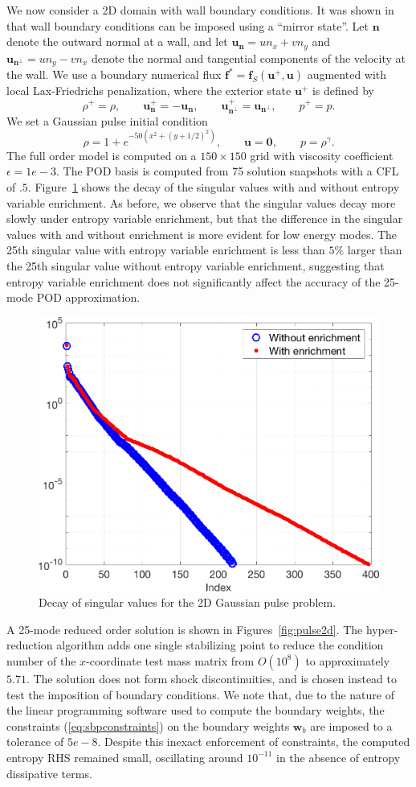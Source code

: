 \documentclass[preprint,10pt]{elsarticle}
\theoremstyle{definition}
\theoremstyle{lemma}
\theoremstyle{theorem}
\theoremstyle{assumption}
\newcommand{\LRp}[1]{\left( #1 \right)}
\begin{document}
We now consider a 2D domain with wall boundary conditions.  It was shown in \cite{svard2014entropy, chen2017entropy} that wall boundary conditions can be imposed using a ``mirror state''.  Let $\bm{n}$ denote the outward normal at a wall, and let $\bm{u}_{\bm{n}} = un_x + vn_y$ and $\bm{u}_{\bm{n}^\perp} = un_y - vn_x$ denote the normal and tangential components of the velocity at the wall.  We use a boundary numerical flux $\bm{f}^* = \bm{f}_S\LRp{\bm{u}^+,\bm{u}}$ augmented with local Lax-Friedrichs penalization, where the exterior state $\bm{u}^+$ is defined by
\[
\rho^+ = \rho, \qquad \bm{u}_{\bm{n}}^+ = -\bm{u}_{\bm{n}}, \qquad \bm{u}_{\bm{n}^\perp}^+ = \bm{u}_{\bm{n}^\perp}, \qquad p^+ = p.  
\]
We set a Gaussian pulse initial condition 
\[
\rho = 1 + e^{-50\LRp{x^2+(y+1/2)^2}}, \qquad \bm{u} = \bm{0}, \qquad p = \rho^{\gamma}.  
\]
The full order model is computed on a $150\times 150$ grid with viscosity coefficient $\epsilon = 1e-3$.  The POD basis is computed from 75 solution snapshots with a CFL of $.5$.  Figure~\ref{fig:pulse2dsvd} shows the decay of the singular values with and without entropy variable enrichment.  As before, we observe that the singular values decay more slowly under entropy variable enrichment, but that the difference in the singular values with and without enrichment is more evident for low energy modes.  The 25th singular value with entropy variable enrichment is less than $5\%$ larger than the 25th singular value without entropy variable enrichment, suggesting that entropy variable enrichment does not significantly affect the accuracy of the 25-mode POD approximation.  

\begin{figure}
\centering
\includegraphics[width=.4\textwidth]{figs/pulse2dsvd.png}
\caption{Decay of singular values for the 2D Gaussian pulse problem.}
\label{fig:pulse2dsvd}
\end{figure}

A 25-mode reduced order solution is shown in Figures~\ref{fig:pulse2d}.  The hyper-reduction algorithm adds one single stabilizing point to reduce the condition number of the $x$-coordinate test mass matrix from $O(10^{8})$ to approximately $5.71$.  The solution does not form shock discontinuities, and is chosen instead to test the imposition of boundary conditions.  We note that, due to the nature of the linear programming software used to compute the boundary weights, the constraints (\ref{eq:sbpconstraints}) on the boundary weights $\bm{w}_b$ are imposed to a tolerance of $5e-8$.  Despite this inexact enforcement of constraints, the computed entropy RHS remained small, oscillating around $10^{-11}$ in the absence of entropy dissipative terms.  
\end{document}
